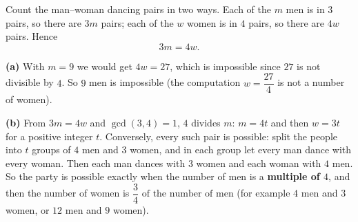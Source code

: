 Count the man--woman dancing pairs in two ways. Each of the $m$ men is in $3$ pairs, so there are $3m$ pairs; each of the $w$ women is in $4$ pairs, so there are $4w$ pairs. Hence
\[
3m=4w .
\]

\textbf{(a)} With $m=9$ we would get $4w=27$, which is impossible since $27$ is not divisible by $4$. So $9$ men is impossible (the computation $w=\dfrac{27}{4}$ is not a number of women).

\textbf{(b)} From $3m=4w$ and $\gcd(3,4)=1$, $4$ divides $m$: $m=4t$ and then $w=3t$ for a positive integer $t$. Conversely, every such pair is possible: split the people into $t$ groups of $4$ men and $3$ women, and in each group let every man dance with every woman. Then each man dances with $3$ women and each woman with $4$ men. So the party is possible exactly when the number of men is a \textbf{multiple of $4$}, and then the number of women is $\boxed{\dfrac{3}{4}\text{ of the number of men}}$ (for example $4$ men and $3$ women, or $12$ men and $9$ women).
